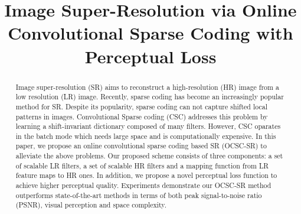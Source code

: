 \documentclass[conference]{IEEEtran}
\begin{document}
\title{Image Super-Resolution via Online Convolutional Sparse Coding with Perceptual Loss\\

}

\author{
\and
{}
\and
{}
\and
{}

}

\maketitle

\begin{abstract}
Image super-resolution (SR) aims to reconstruct a high-resolution (HR) image from a low resolution (LR) image. Recently, sparse coding has become an increasingly popular method for SR. Despite its popularity, sparse coding can not capture shifted local patterns in images. Convolutional Sparse coding (CSC) addresses this problem by learning a shift-invariant dictionary composed of many filters. However, CSC oparates in the batch mode which needs large space and is computationally expensive. In this paper, we propose an online convolutional sparse coding based SR (OCSC-SR) to alleviate the above problems. Our proposed scheme consists of three components: a set of scalable LR filters, a set of scalable HR filters and a mapping function from LR feature maps to HR ones. In addition, we propose a novel perceptual loss function to achieve higher perceptual quality. Experiments demonstrate our OCSC-SR method outperforms state-of-the-art methods in terms of both peak signal-to-noise ratio (PSNR), visual perception and space complexity. 
\end{abstract}
\end{document}
